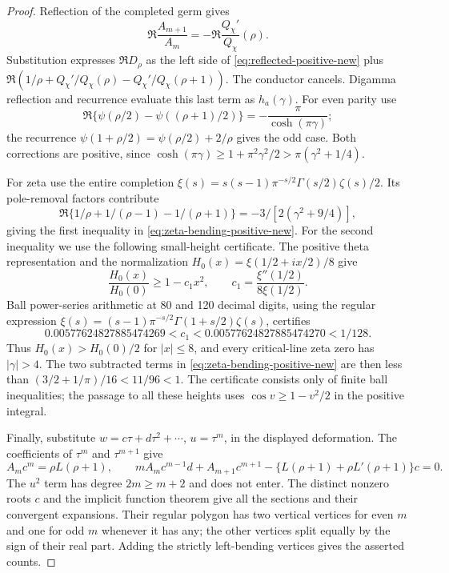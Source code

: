 \begin{proof}
Reflection of the completed germ gives
\[
 \Re\frac{A_{m+1}}{A_m}=-\Re\frac{Q_\chi'}{Q_\chi}(\rho).
\]
Substitution expresses $\Re D_\rho$ as the left side of
\eqref{eq:reflected-positive-new} plus
$\Re(1/\rho+Q_\chi'/Q_\chi(\rho)-Q_\chi'/Q_\chi(\rho+1))$.
The conductor cancels. Digamma reflection and recurrence
\cite[Section~5.5, equations (2), (4)]{dlmf} evaluate this last
term as $h_a(\gamma)$. For even parity use
\[
 \Re\{\psi(\rho/2)-\psi((\rho+1)/2)\}
       =-\frac\pi{\cosh(\pi\gamma)};
\]
the recurrence $\psi(1+\rho/2)=\psi(\rho/2)+2/\rho$
gives the odd case. Both corrections are positive, since
$\cosh(\pi\gamma)\ge1+\pi^2\gamma^2/2>
\pi(\gamma^2+1/4)$.

For zeta use the entire completion
$\xi(s)=s(s-1)\pi^{-s/2}\Gamma(s/2)\zeta(s)/2$.
Its pole-removal factors contribute
\[
 \Re\{1/\rho+1/(\rho-1)-1/(\rho+1)\}
             =-3/[2(\gamma^2+9/4)],
\]
giving the first inequality in
\eqref{eq:zeta-bending-positive-new}. For the second inequality we use the following
small-height certificate.
The positive theta representation and the normalization
$H_0(x)=\xi(1/2+ix/2)/8$ give
\[
 \frac{H_0(x)}{H_0(0)}\ge1-c_1x^2,\qquad
 c_1=\frac{\xi''(1/2)}{8\xi(1/2)}.
\]
Ball power-series arithmetic at 80 and 120 decimal digits,
using the regular expression
$\xi(s)=(s-1)\pi^{-s/2}\Gamma(1+s/2)\zeta(s)$,
certifies
\[
 0.00577624827885474269<c_1<0.00577624827885474270<1/128.
\]
Thus $H_0(x)>H_0(0)/2$ for $|x|\le8$, and every
critical-line zeta zero has $|\gamma|>4$. The two subtracted
terms in \eqref{eq:zeta-bending-positive-new} are then less
than $(3/2+1/\pi)/16<11/96<1$. The certificate consists
only of finite ball inequalities; the passage to all these
heights uses $\cos v\ge1-v^2/2$ in the positive integral.

Finally, substitute $w=c\tau+d\tau^2+\cdots$, $u=\tau^m$,
in the displayed deformation. The coefficients of $\tau^m$
and $\tau^{m+1}$ give
\[
 A_mc^m=\rho L(\rho+1),\qquad
 mA_mc^{m-1}d+A_{m+1}c^{m+1}
       -\{L(\rho+1)+\rho L'(\rho+1)\}c=0.
\]
The $u^2$ term has degree $2m\ge m+2$ and does not enter.
The distinct nonzero roots $c$ and the implicit function
theorem give all the sections and their convergent expansions.
Their regular polygon has two vertical vertices for even $m$
and one for odd $m$ whenever it has any; the other vertices
split equally by the sign of their real part. Adding the
strictly left-bending vertices gives the asserted counts.
\end{proof}


